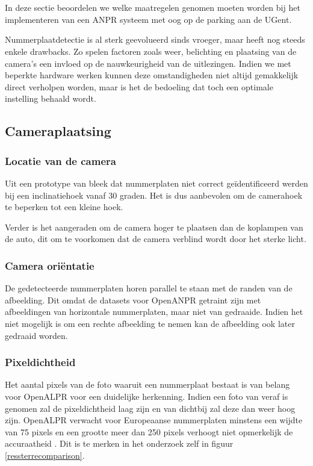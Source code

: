 
\chapter{}
\label{ch:maatregelenanpr}

In deze sectie beoordelen we welke maatregelen genomen moeten worden bij het implementeren van een ANPR systeem met oog op de parking aan de UGent.

Nummerplaatdetectie is al sterk geevolueerd sinds vroeger, maar heeft nog steeds enkele drawbacks. Zo spelen factoren zoals weer, belichting en plaatsing van de camera's een invloed op de nauwkeurigheid van de uitlezingen. Indien we met beperkte hardware werken kunnen deze omstandigheden niet altijd gemakkelijk direct verholpen worden, maar is het de bedoeling dat toch een optimale instelling behaald wordt.

\section{Cameraplaatsing}

\subsection{Locatie van de camera}
Uit een prototype van \textcite{arrieta2019prototype} bleek dat nummerplaten niet correct geïdentificeerd werden bij een inclinatiehoek vanaf 30 graden. Het is dus aanbevolen om de camerahoek te beperken tot een kleine hoek.

Verder is het aangeraden om de camera hoger te plaatsen dan de koplampen van de auto, dit om te voorkomen dat de camera verblind wordt door het sterke licht.

\subsection{Camera oriëntatie}
De gedetecteerde nummerplaten horen parallel te staan met de randen van de afbeelding. Dit omdat de datasets voor OpenANPR getraint zijn met afbeeldingen van horizontale nummerplaten, maar niet van gedraaide. Indien het niet mogelijk is om een rechte afbeelding te nemen kan de afbeelding ook later gedraaid worden.

\subsection{Pixeldichtheid}
Het aantal pixels van de foto waaruit een nummerplaat bestaat is van belang voor OpenALPR voor een duidelijke herkenning. Indien een foto van veraf is genomen zal de pixeldichtheid laag zijn en van dichtbij zal deze dan weer hoog zijn. OpenALPR verwacht voor Europeaanse nummerplaten minstens een wijdte van 75 pixels en een grootte meer dan 250 pixels verhoogt niet opmerkelijk de accuraatheid  \autocite{openalprcameraplacement}. Dit is te merken in het onderzoek zelf in figuur \ref{ressterrecomparison}.

